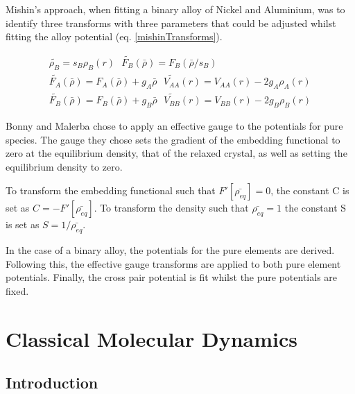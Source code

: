 Mishin's approach, when fitting a binary alloy of Nickel and Aluminium, was to identify three transforms with three parameters that could be adjusted whilst fitting the alloy potential (eq. \ref{mishinTransforms}).

\begin{equation}
\begin{split}
\tilde{\rho_B} = s_B \rho_B(r) \text{    } \tilde{F_B}(\bar{\rho}) = F_B (\bar{\rho}/s_B) \\
\tilde{F_A} (\bar{\rho}) = F_A (\bar{\rho}) + g_A \bar{\rho}  \text{    } \tilde{V_{AA}}(r) = V_{AA}(r) - 2g_A \rho_A (r) \\
\tilde{F_B} (\bar{\rho}) = F_B (\bar{\rho}) + g_B \bar{\rho}  \text{    } \tilde{V_{BB}}(r) = V_{BB}(r) - 2g_B \rho_B (r)
\end{split}
\label{eq:mishinTransforms}
\end{equation}

Bonny and Malerba chose to apply an effective gauge to the potentials for pure species.  The gauge they chose sets the gradient of the embedding functional to zero at the equilibrium density, that of the relaxed crystal, as well as setting the equilibrium density to zero.

To transform the embedding functional such that $F'[\bar{\rho_{eq}}] = 0$, the constant C is set as $C = -F'[\bar{\rho_{eq}}]$.  To transform the density such that $\bar{\rho_{eq}} = 1$ the constant S is set as $S = 1 / \bar{\rho_{eq}}$\cite{bonnymalerba}.

In the case of a binary alloy, the potentials for the pure elements are derived.  Following this, the effective gauge transforms are applied to both pure element potentials.  Finally, the cross pair potential is fit whilst the pure potentials are fixed.









\section{Classical Molecular Dynamics}

\subsection{Introduction}


